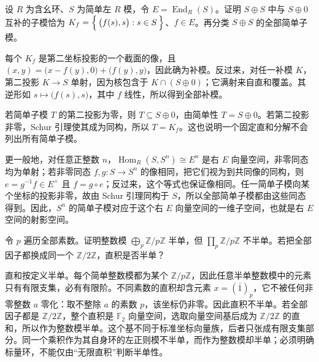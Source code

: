 \begin{exercise}\label{b2:ex:13-graph-submodules}
	设 \(R\) 为含幺环、\(S\) 为简单左 \(R\) 模，令 \(E=\operatorname{End}_R(S)\)。证明 \(S\oplus S\) 中与 \(S\oplus0\) 互补的子模恰为 \(K_f=\Bigl\{\,\bigl(f(s),s\bigr):s\in S\,\Bigr\}\)、\(f\in E\)。再分类 \(S\oplus S\) 的全部简单子模。
\end{exercise}
\begin{solution}
	每个 \(K_f\) 是第二坐标投影的一个截面的像，且 \((x,y)=\bigl(x-f(y),0\bigr)+\bigl(f(y),y\bigr)\)，因此确为补模。反过来，对任一补模 \(K\)，第二投影 \(K\to S\) 单射，因为核包含于 \(K\cap(S\oplus0)\)；它满射来自直和覆盖。其逆形如 \(s\mapsto\bigl(f(s),s\bigr)\)，其中 \(f\) 线性，所以得到全部补模。

	若简单子模 \(T\) 的第二投影为零，则 \(T\subseteq S\oplus0\)，由简单性 \(T=S\oplus0\)。若第二投影非零，Schur 引理使其成为同构，所以 \(T=K_f\)。这也说明一个固定直和分解不会列出所有简单子模。

	更一般地，对任意正整数 \(n\)，\(\operatorname{Hom}_R(S,S^n)\cong E^n\) 是右 \(E\) 向量空间，非零同态均为单射；若非零同态 \(f,g:S\to S^n\) 的像相同，把它们视为到共同像的同构，则 \(e=g^{-1}f\in E^\times\) 且 \(f=g\circ e\)；反过来，这个等式也保证像相同。任一简单子模向某个坐标的投影非零，故由 Schur 引理同构于 \(S\)，所以全部简单子模都由这些同态得到。因此，\(S^n\) 的简单子模对应于这个右 \(E\) 向量空间的一维子空间，也就是右 \(E\) 空间的射影空间。
\end{solution}

\begin{exercise}\label{b2:ex:13-products-of-simple-modules}
	令 \(p\) 遍历全部素数。证明整数模 \(\bigoplus_p\mathbb Z/p\mathbb Z\) 半单，但 \(\prod_p\mathbb Z/p\mathbb Z\) 不半单。若把全部因子都换成同一个 \(\mathbb Z/2\mathbb Z\)，直积是否半单？
\end{exercise}
\begin{solution}
	直和按定义半单。每个简单整数模都为某个 \(\mathbb Z/p\mathbb Z\)，因此任意半单整数模中的元素只有有限支集，必有有限阶。不同素数的直积却含元素 \(x=(\bar1)_p\)，它不被任何非零整数 \(a\) 零化：取不整除 \(a\) 的素数 \(p\)，该坐标仍非零。因此直积不半单。若全部因子都是 \(\mathbb Z/2\mathbb Z\)，整个直积是 \(\mathbb F_2\) 向量空间，选取向量空间基后成为 \(\mathbb Z/2\mathbb Z\) 的直和，所以作为整数模半单。这个基不同于标准坐标向量族，后者只张成有限支集部分。同一个乘积作为其自身环的左正则模不半单，而作为整数模却半单；必须明确标量环，不能仅由“无限直积”判断半单性。
\end{solution}

